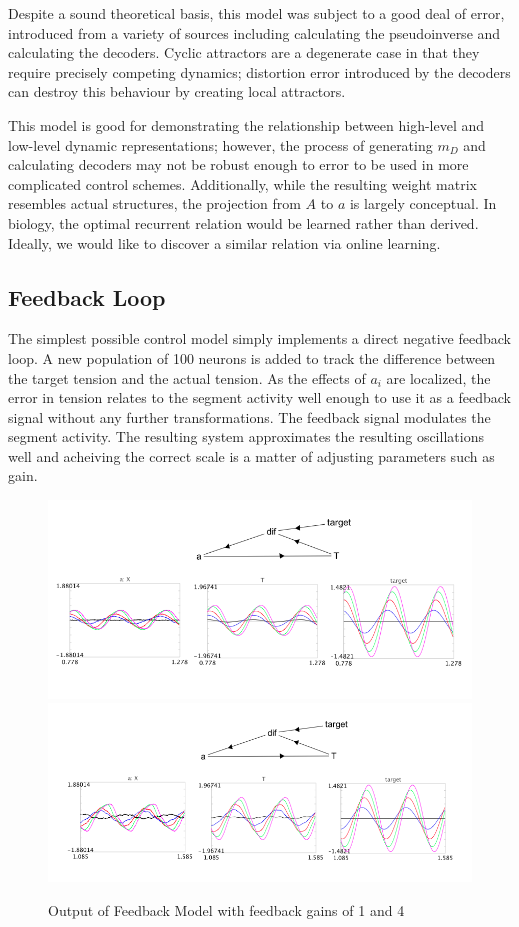\documentclass[12pt]{article}
\begin{document}
Despite a sound theoretical basis, this model was subject to a good deal of error, introduced from a variety of sources including calculating the pseudoinverse and calculating the decoders. Cyclic attractors are a degenerate case in that they require precisely competing dynamics; distortion error introduced by the decoders can destroy this behaviour by creating local attractors. 

This model is good for demonstrating the relationship between high-level and low-level dynamic representations; however, the process of generating \(m_D\) and calculating decoders may not be robust enough to error to be used in more complicated control schemes. Additionally, while the resulting weight matrix resembles actual structures, the projection from \(A\) to \(a\) is largely conceptual. In biology, the optimal recurrent relation would be learned rather than derived. Ideally, we would like to discover a similar relation via online learning. 

\subsection{Feedback Loop}
The simplest possible control model simply implements a direct negative feedback loop. A new population of 100 neurons is added to track the difference between the target tension and the actual tension. As the effects of \(a_i\) are localized, the error in tension relates to the segment activity well enough to use it as a feedback signal without any further transformations. The feedback signal modulates the segment activity. The resulting system approximates the resulting oscillations well and acheiving the correct scale is a matter of adjusting parameters such as gain. 

    \begin{figure}[h!]
      \centering
      \includegraphics[scale=0.5]{feedback1.png}
      \includegraphics[scale=0.5]{feedback2.png}
      \caption[Output of Feedback Model]{Output of Feedback Model with feedback gains of 1 and 4}
    \end{figure}
\end{document}
